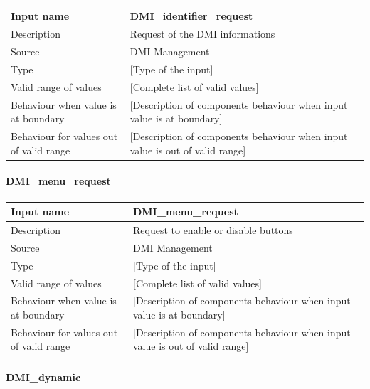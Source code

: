 \begin{longtable}{p{}p{}}
\toprule
Input name				& DMI\_identifier\_request \\
\midrule
Description				& Request of the DMI informations \\
\midrule
Source					& DMI Management \\ 
\midrule
Type					& [Type of the input] \\
\midrule
Valid range of values	& [Complete list of valid values] \\
\midrule
Behaviour when value is at boundary	& [Description of components behaviour when input value is at boundary] \\
\midrule
Behaviour for values out of valid range	& [Description of components behaviour when input value is out of valid range] \\
\bottomrule
\end{longtable}

\paragraph{DMI\_menu\_request}

\begin{longtable}{p{}p{}}
\toprule
Input name				& DMI\_menu\_request \\
\midrule
Description				& Request to enable or disable buttons \\
\midrule
Source					& DMI Management \\ 
\midrule
Type					& [Type of the input] \\
\midrule
Valid range of values	& [Complete list of valid values] \\
\midrule
Behaviour when value is at boundary	& [Description of components behaviour when input value is at boundary] \\
\midrule
Behaviour for values out of valid range	& [Description of components behaviour when input value is out of valid range] \\
\bottomrule
\end{longtable}

\paragraph{DMI\_dynamic}

